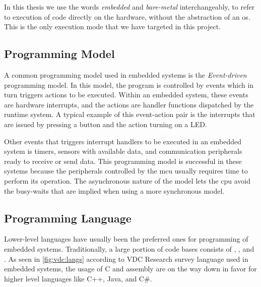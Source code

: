 In this thesis we use the words \emph{embedded} and \emph{bare-metal} interchangeably, to refer to execution of code directly on the hardware, without the abstraction of an \gls{os}.
This is the only execution mode that we have targeted in this project.

\subsection{Programming Model}

A common programming model used in embedded systems is the \emph{Event-driven} programming model.
In this model, the program is controlled by events which in turn triggers actions to be executed.
Within an embedded system, these events are hardware interrupts, and the actions are handler functions dispatched by the runtime system.
A typical example of this event-action pair is the interrupts that are issued by pressing a button and the action turning on a LED.

Other events that triggers interrupt handlers to be executed in an embedded system is timers, sensors with available data, and communication peripherals ready to receive or send data.
This programming model is successful in these systems because the peripherals controlled by the \gls{mcu} usually requires time to perform its operation.
The asynchronous nature of the model lets the \gls{cpu} avoid the busy-waits that are implied when using a more synchronous model.

\subsection{Programming Language}

Lower-level languages have usually been the preferred ones for programming of embedded systems.
Traditionally, a large portion of code bases consists of {\C}, , and {\Cpp}.
As seen in \autoref{fig:vdc:langs} according to VDC Research \cite{web:vdc} survey language used in embedded systems, the usage of C and assembly are on the way down in favor for higher level languages like C++, Java, and C\#.

